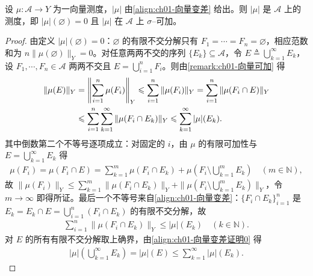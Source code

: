 \documentclass[../../main.tex]{subfiles}%
\begin{document}
\begin{proposition}\label{proposition:ch01-向量变差是测度}
设 $\mu:\mathcal{A}\to Y$ 为一向量测度，$|\mu|$ 由\eqref{align:ch01-向量变差} 给出。则 $|\mu|$ 是 $\mathcal{A}$ 上的测度，即 $|\mu|(\varnothing)=0$ 且 $|\mu|$ 在 $\mathcal{A}$ 上 $\sigma$--可加。
\end{proposition}

\begin{proof}
由定义 $|\mu|(\varnothing)=0$：$\varnothing$ 的有限不交分解只有 $F_1=\cdots =F_n=\varnothing$，相应范数和为 $n\|\mu(\varnothing)\|_Y=0$。对任意两两不交的序列 $\{E_k\}\subseteq\mathcal{A}$，令 $E\triangleq\bigcup_{k=1}^\infty E_k$，设 $F_1,\cdots ,F_n\in\mathcal{A}$ 两两不交且 $E=\bigcup_{i=1}^n F_i$。则由\cref{remark:ch01-向量可加} 得
\begin{align}
\|\mu(E)\|_Y
&=\left\|\sum_{i=1}^n\mu(F_i)\right\|_Y
\leqslant\sum_{i=1}^n\|\mu(F_i)\|_Y
=\sum_{i=1}^n\|\mu(F_i\cap E)\|_Y\notag\\
&\leqslant\sum_{i=1}^n\sum_{k=1}^\infty\|\mu(F_i\cap E_k)\|_Y
\leqslant\sum_{k=1}^\infty|\mu|(E_k). \label{align:ch01-向量变差证明0}
\end{align}
其中倒数第二个不等号逐项成立：对固定的 $i$，由 $\mu$ 的有限可加性与 $E=\bigcup_{k=1}^\infty E_k$ 得
\begin{align*}
\mu(F_i)=\mu(F_i\cap E)=\sum_{k=1}^m\mu(F_i\cap E_k)+\mu\left(F_i\setminus\bigcup_{k=1}^m E_k\right)\quad(m\in\mathbb{N}),
\end{align*}
故 $\|\mu(F_i)\|_Y\leqslant\sum_{k=1}^m\|\mu(F_i\cap E_k)\|_Y+\|\mu(F_i\setminus\bigcup_{k=1}^m E_k)\|_Y$，令 $m\to\infty$ 即得所证。最后一个不等号来自\eqref{align:ch01-向量变差}：$\{F_i\cap E_k\}_{i=1}^n$ 是 $E_k=E_k\cap E=\bigcup_{i=1}^n(F_i\cap E_k)$ 的有限不交分解，故
\begin{align}
\sum_{i=1}^n\|\mu(F_i\cap E_k)\|_Y\leqslant|\mu|(E_k)\quad(k\in\mathbb{N}). \label{align:ch01-向量变差证明0b}
\end{align}
对 $E$ 的所有有限不交分解取上确界，由\eqref{align:ch01-向量变差证明0} 得
\begin{align}
|\mu|\left(\bigcup_{k=1}^\infty E_k\right)=|\mu|(E)\leqslant\sum_{k=1}^\infty|\mu|(E_k). \label{align:ch01-向量变差证明1}
\end{align}


\end{proof}
\end{document}
